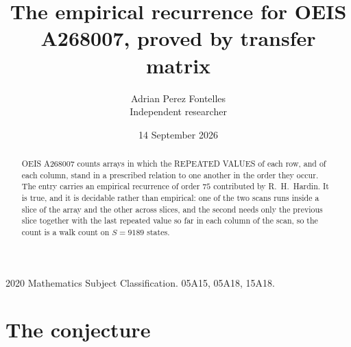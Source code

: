 \documentclass[11pt,a4paper]{article}
\title{The empirical recurrence for OEIS A268007, proved by transfer matrix}
\author{Adrian Perez Fontelles\\ \small Independent researcher}
\date{14 September 2026}
\theoremstyle{plain}
\theoremstyle{definition}
\begin{document}
\maketitle

\begin{abstract}
OEIS A268007 counts arrays in which the REPEATED VALUES of each row, and of each column, stand in a
prescribed relation to one another in the order they occur. The entry carries an empirical
recurrence of order $75$ contributed by R.~H.~Hardin. It is true, and it is decidable
rather than empirical: one of the two scans runs inside a slice of the array and the other
across slices, and the second needs only the previous slice together with the last repeated
value so far in each column of the scan, so the count is a walk count on $S=9189$ states.
\end{abstract}

\noindent\small 2020 Mathematics Subject Classification. 05A15, 05A18, 15A18.\normalsize

\section{The conjecture}
\end{document}
